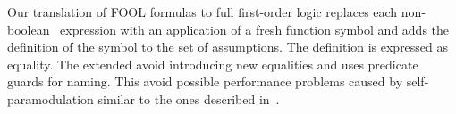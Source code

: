 Our translation of FOOL formulas to full first-order logic replaces each non-boolean \ITE\ expression with an application of a fresh function symbol and adds the definition of the symbol to the set of assumptions. The definition is expressed as equality. The extended \newcnf{} avoid introducing new equalities and uses predicate guards for naming. This avoid possible performance problems caused by self-paramodulation similar to the ones described in~\cite{FOOL}.

%


%

